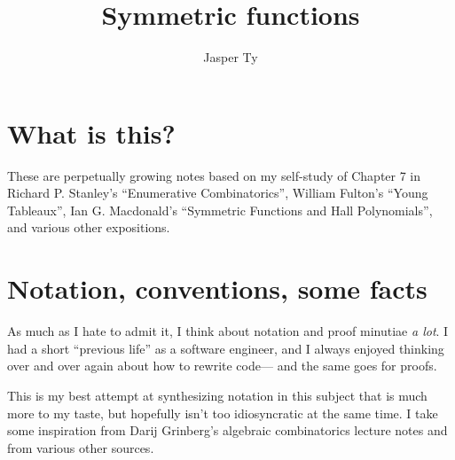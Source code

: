 \documentclass{article}
\title{Symmetric functions}
\author{Jasper Ty}
\date{}
\begin{document}
\maketitle

\section*{What is this?}

These are perpetually growing notes based on my self-study of Chapter 7 in Richard P. Stanley's ``Enumerative Combinatorics'', William Fulton's ``Young Tableaux'', Ian G. Macdonald's ``Symmetric Functions and Hall Polynomials'', and various other expositions. 

\iffalse 
I've learned to \textit{love} this subject! At first, I thought ``Functions that remain the same change under interchange of variables? What's so interesting about that?'', but at some point between now and the end of my undergraduate life, I took it on myself to \textit{compute} with these things, to hold them with my bare hands, and lo--- I suddenly found myself baptized in the waters of symmetric polynomials.

I'm not entirely sure how to write for an audience yet, so certain things might be over or under explained, and this might happen all over the place!
I guess, one has to have had some combinatorics, knowing about posets, partitions, coming up with bijections, and so on. 
Also experience with working with formal power series probably helps.

I'll be honest and say algebra is not my strong suit, so I apologize in advance if that manifests particularly clearly in some sections.
\fi


\tableofcontents

\section*{Notation, conventions, some facts}

\iffalse
As much as I hate to admit it, I think about notation and proof minutiae \textit{a lot}.
I had a short ``previous life'' as a software engineer, and I always enjoyed thinking over and over again about how to rewrite code--- and the same goes for proofs.

This is my best attempt at synthesizing notation in this subject that is much more to my taste, but hopefully isn't too idiosyncratic at the same time.
I take some inspiration from Darij Grinberg's algebraic combinatorics lecture notes \cite{DarijAC} and from various other sources.
\end{document}
